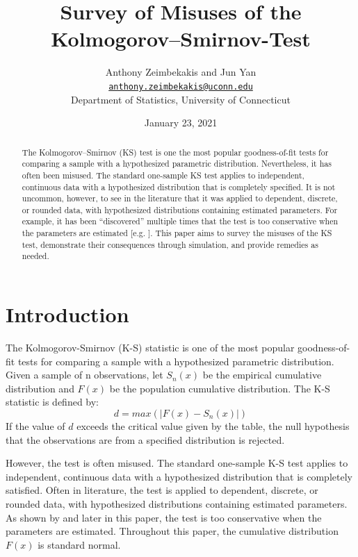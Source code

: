 \documentclass[12pt, letterpaper, titlepage]{article}
\title{Survey of Misuses of the Kolmogorov–Smirnov-Test}
\author{Anthony Zeimbekakis and Jun Yan\\
\href{mailto:anthony.zeimbekakis@uconn.edu}{\nolinkurl{anthony.zeimbekakis@uconn.edu}}\\
Department of Statistics, University of Connecticut}
\date{January 23, 2021}
\begin{document}
\maketitle

\doublespace

\begin{abstract}
The Kolmogorov–Smirnov (KS) test is one the most popular goodness-of-fit tests for comparing a sample with a hypothesized parametric distribution. Nevertheless, it has often been misused. The standard one-sample KS test applies to independent, continuous data with a hypothesized distribution that is completely specified. It is not uncommon, however, to see in the literature that it was applied to dependent, discrete, or rounded data, with hypothesized distributions containing estimated parameters. For example, it has been “discovered” multiple times that the test is too conservative when the parameters are estimated [e.g. \citet{Steinskog}]. This paper aims to survey the misuses of the KS test, demonstrate their consequences through simulation, and provide remedies as needed.
\end{abstract}


\hypertarget{sec:intro}{%
\section{Introduction}\label{sec:intro}}

The Kolmogorov-Smirnov (K-S) statistic is one of the most popular goodness-of-fit tests for comparing a sample with a hypothesized parametric distribution. Given a sample of n observations, let $S_{n}(x)$ be the empirical cumulative distribution and $F(x)$ be the population cumulative distribution. The K-S statistic is defined by: \[d = max(\lvert F(x)-S_{n}(x) \rvert)\] If the value of $d$ exceeds the critical value given by the table, the null hypothesis that the observations are from a specified distribution is rejected. 

However, the test is often misused. The standard one-sample K-S test applies to independent, continuous data with a hypothesized distribution that is completely satisfied. Often in literature, the test is applied to dependent, discrete, or rounded data, with hypothesized distributions containing estimated parameters. As shown by \citet{Steinskog} and later in this paper, the test is too conservative when the parameters are estimated. Throughout this paper, the cumulative distribution $F(x)$ is standard normal.
\end{document}
